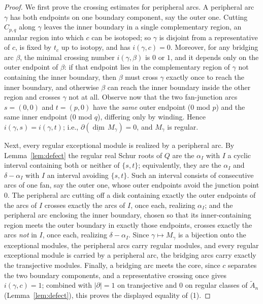 \documentclass[11pt, a4paper]{amsart}
\theoremstyle{definition}
\begin{document}
\begin{proof}
We first prove the crossing estimates for peripheral arcs. A peripheral
arc $\gamma$ has both endpoints on one boundary component, say the outer
one. Cutting $C_{p, q}$ along $\gamma$ leaves the inner boundary in a
single complementary region, an annular region into which $c$ can be
isotoped; so $\gamma$ is disjoint from a representative of $c$, is fixed
by $t_c$ up to isotopy, and has $i(\gamma, c) = 0$. Moreover, for any
bridging arc $\beta$, the minimal crossing number $i(\gamma, \beta)$ is
$0$ or $1$, and it depends only on the outer endpoint of $\beta$: if that
endpoint lies in the complementary region of $\gamma$ not containing the
inner boundary, then $\beta$ must cross $\gamma$ exactly once to reach
the inner boundary, and otherwise $\beta$ can reach the inner boundary
inside the other region and crosses $\gamma$ not at all. Observe now that
the two fan-junction arcs $s = (0, 0)$ and $t = (p, 0)$ have the
\emph{same} outer endpoint \textup{(}$0$ mod $p$\textup{)} and the same
inner endpoint \textup{(}$0$ mod $q$\textup{)}, differing only by
winding. Hence $i(\gamma, s) = i(\gamma, t)$; i.e.,
$\partial(\underline{\dim}\, M_\gamma) = 0$, and $M_\gamma$ is regular.

Next, every regular exceptional module is realized by a peripheral arc.
By Lemma~\ref{lem:defect} the regular real Schur roots of $Q$ are the
$\alpha_I$ with $I$ a cyclic interval containing both or neither of
$\{s, t\}$; equivalently, they are the $\alpha_I$ and $\delta - \alpha_I$
with $I$ an interval avoiding $\{s, t\}$. Such an interval consists of
consecutive arcs of one fan, say the outer one, whose outer endpoints
avoid the junction point $0$. The peripheral arc cutting off a disk
containing exactly the outer endpoints of the arcs of $I$ crosses exactly
the arcs of $I$, once each, realizing $\alpha_I$; and the peripheral arc
enclosing the inner boundary, chosen so that its inner-containing region
meets the outer boundary in exactly those endpoints, crosses exactly the
arcs \emph{not} in $I$, once each, realizing $\delta - \alpha_I$. Since
$\gamma \mapsto M_\gamma$ is a bijection onto the exceptional modules,
the peripheral arcs carry regular modules, and every regular exceptional
module is carried by a peripheral arc, the bridging arcs carry exactly
the transjective modules. Finally, a bridging arc meets the core, since
$c$ separates the two boundary components, and a representative crossing
once gives $i(\gamma, c) = 1$; combined with $|\partial| = 1$ on
transjective and $0$ on regular classes of $\widetilde{A}_n$
\textup{(}Lemma~\ref{lem:defect}\textup{)}, this proves the displayed
equality of (1).


\end{proof}
\end{document}
